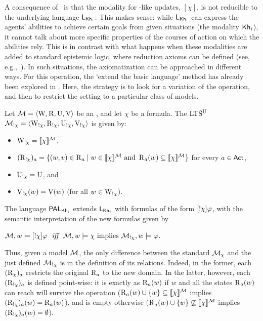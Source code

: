 A consequence of~ is that the modality for \PAL-like updates, $[\chi]$, is not reducible to the underlying language $\mathsf{L}_{{\sf Kh}_i}$. This makes sense: while $\mathsf{L}_{{\sf Kh}_i}$ can express the agents' abilities to achieve certain goals from given situations (the modality ${\sf Kh}_i$), it cannot talk about more specific properties of the courses of action on which the abilities rely. This is in contrast with what happens when these modalities are added to standard epistemic logic, where reduction axioms can be defined (see, e.g.,~\cite{DELbook}). In such situations, the axiomatization can be approached in different ways. For this operation, the `extend the basic language' method has already been explored in \cite{Wang2016}. Here, the strategy is to look for a variation of the operation, and then to restrict the setting to a particular class of models.

\medskip

\begin{definition}\label{def:annupdate}\label{def:pakhsyntax}
Let $\mathcal{M} = \langle \operatorname{W}, \operatorname{R}, \operatorname{U}, \operatorname{V} \rangle$ be an \ults, and let $\chi$ be a formula. The $\textup{LTS$^\text{\textup{U}}$}$ $\mathcal{M}_{!\chi} = \langle \operatorname{W}_{!\chi}, \operatorname{R}_{!\chi}, \operatorname{U}_{!\chi}, \operatorname{V}_{!\chi} \rangle$ is given by:
\begin{itemize}
\item $\operatorname{W}_{!\chi} = \llbracket \chi \rrbracket^{\mathcal{M}}$,
\item $(\operatorname{R}_{!\chi})_a = \{ (w,v) \in \operatorname{R}_a \mid w \in \llbracket \chi \rrbracket^{\mathcal{M}} \text{ and } \operatorname{R}_a(w) \subseteq \llbracket \chi \rrbracket^{\mathcal{M}} \}$ for every $a \in {\rm \sf Act}$,
\item $\operatorname{U}_{!\chi} = \operatorname{U}$, and 
\item $\operatorname{V}_{!\chi}(w) = \operatorname{V}(w)$ (for all $w\in\operatorname{W}_{!\chi}$).
\end{itemize}
\smallskip
The language $\mathsf{PAL}_{{\sf Kh}_i}$ extends $\mathsf{L}_{{\sf Kh}_i}$ with formulas of the form $[!\chi]\varphi$, with the semantic interpretation of the new formulas given by
\begin{spcenter}
	$\modults,w \models \gann{\chi}\varphi \ \ \iff \ \ \modults,w \models \chi \mbox{ implies } \annmodelchi,w \models \varphi$.
\end{spcenter}
\end{definition}

Thus, given a model $\mathcal{M}$, the only difference between the standard $\mathcal{M}_{\chi}$ and the just defined $\mathcal{M}_{!\chi}$ is in the definition of 
its relations. Indeed, in the former, each $(\operatorname{R}_\chi)_a$ restricts the original $\operatorname{R}_a$ to the new domain. In the latter, however, each $(\operatorname{R}_{!\chi})_a$ is defined point-wise: it is exactly as $\operatorname{R}_a(w)$ if $w$ and all the states $\operatorname{R}_a(w)$ can reach will survive the operation ($\operatorname{R}_a(w) \cup \{ w \} \subseteq \llbracket \chi \rrbracket^{\mathcal{M}}$ implies $(\operatorname{R}_{!\chi})_a(w) = \operatorname{R}_a(w)$), and is empty otherwise ($\operatorname{R}_a(w) \cup \{ w \} \not \subseteq \llbracket \chi \rrbracket^{\mathcal{M}}$ implies $(\operatorname{R}_{!\chi})_a(w) = \emptyset$).

